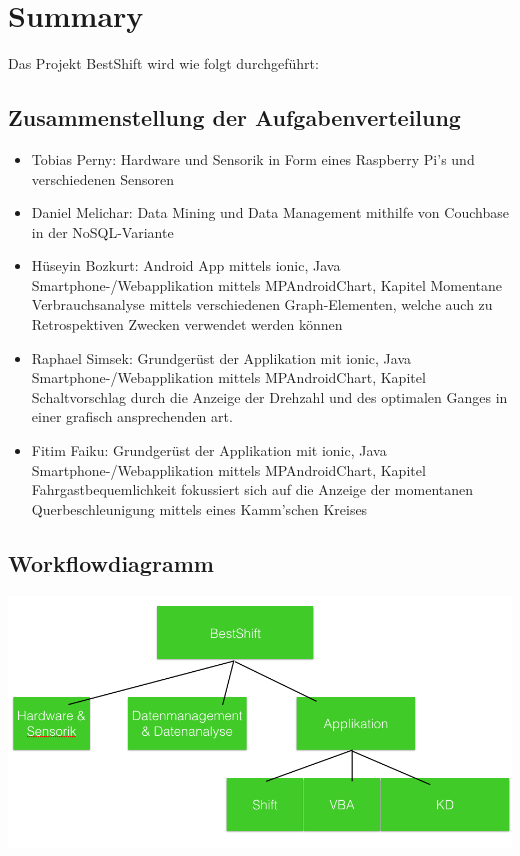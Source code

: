 \chapter{Summary}
Das Projekt BestShift wird wie folgt durchgeführt:
\section{Zusammenstellung der Aufgabenverteilung}
 \begin{itemize}
	 \item Tobias Perny: Hardware und Sensorik in Form eines Raspberry Pi's und verschiedenen Sensoren 
	 \item Daniel Melichar: Data Mining und Data Management mithilfe von Couchbase in der NoSQL-Variante
	 \item Hüseyin Bozkurt: Android App mittels ionic, Java Smartphone-/Webapplikation mittels MPAndroidChart, Kapitel Momentane Verbrauchsanalyse mittels verschiedenen Graph-Elementen, welche auch zu Retrospektiven Zwecken verwendet werden können 
	 \item Raphael Simsek: Grundgerüst der Applikation mit ionic, Java Smartphone-/Webapplikation mittels MPAndroidChart, Kapitel Schaltvorschlag durch die Anzeige der Drehzahl und des optimalen Ganges in einer grafisch ansprechenden art.
	 \item Fitim Faiku: Grundgerüst der Applikation mit ionic, Java Smartphone-/Webapplikation mittels MPAndroidChart, Kapitel Fahrgastbequemlichkeit fokussiert sich auf die Anzeige der momentanen Querbeschleunigung mittels eines Kamm'schen Kreises
 \end{itemize}
\newline
\section{Workflowdiagramm}
\includegraphics[scale=0.5]{images/Workflowdiagramm.png}

